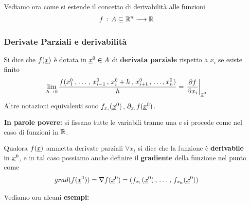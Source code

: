 Vediamo ora come si estende il concetto di derivabilità alle funzioni 
\begin{align}
f \, : \, A \subseteq \mathbb{R}^n \longrightarrow \mathbb{R}
\end{align}

\subsubsection{Derivate Parziali e derivabilità}

Si dice che $f(\underline{x})$ è dotata in $\underline{x}^0 \in A$ di \textbf{derivata parziale} rispetto a $x_i$ se esiste finito
\begin{align}
\underset{h \rightarrow 0}{\lim} \, \frac{f(x^0_1 \, , \, \dots \, , \, x^0_{i-1} \, , \, x^0_i + h \, , \, x^0_{i+1} \, , \, \dots,x^0_n)}{h}=\left. \frac{\partial f}{\partial x_i} \right|_{\underline{x}^0}
\end{align}
Altre notazioni equivalenti sono $f_{x_i}(\underline{x}^0) \, , \, \partial_{x_i}f(\underline{x}^0)$.

\smallskip

\textbf{In parole povere:} si fissano tutte le variabili tranne una e si procede come nel caso di funzioni in $\mathbb{R}$.  

\bigskip

Qualora $f(\underline{x})$ ammetta derivate parziali $\forall x_i$ si dice che la funzione è \textbf{derivabile}  in $\underline{x}^0$, e in tal caso possiamo anche definire il \textbf{gradiente} della funzione nel punto come
\begin{align}
grad(f(\underline{x}^0))= \nabla f(\underline{x}^0)=(f_{x_1}(\underline{x}^0) \, , \, \dots \, , \, f_{x_n}(\underline{x}^0))
\end{align}

Vediamo ora alcuni \textbf{esempi:}

